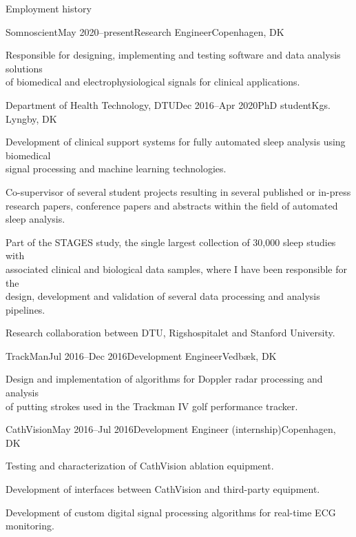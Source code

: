\documentclass{resume} %
\begin{document}
\begin{rSection}{Employment history}

    \begin{rSubsection}{Somnoscient}{May 2020--present}{Research Engineer}{Copenhagen, DK}
		\item Responsible for designing, implementing and testing software and data analysis solutions \\of biomedical and electrophysiological signals for clinical applications.
	\end{rSubsection}
	
	\begin{rSubsection}{Department of Health Technology, DTU}{Dec 2016--Apr 2020}{PhD student}{Kgs. Lyngby, DK}
		\item Development of clinical support systems for fully automated sleep analysis using biomedical\\signal processing and machine learning technologies.
		\item Co-supervisor of several student projects resulting in several published or in-press \\ research papers, conference papers and abstracts within the field of automated sleep analysis.
		\item Part of the STAGES study, the single largest collection of 30,000 sleep studies with \\ associated clinical and biological data samples, where I have been responsible for the \\ design, development and validation of several data processing and analysis pipelines.
		\item Research collaboration between DTU, Rigshospitalet and Stanford University.
	\end{rSubsection}
	
	\begin{rSubsection}{TrackMan}{Jul 2016--Dec 2016}{Development Engineer}{Vedbæk, DK}
		\item Design and implementation of algorithms for Doppler radar processing and analysis\\of putting strokes used in the Trackman IV golf performance tracker.
	\end{rSubsection}
	
	\begin{rSubsection}{CathVision}{May 2016--Jul 2016}{Development Engineer (internship)}{Copenhagen, DK}
		\item Testing and characterization of CathVision ablation equipment.
		\item Development of interfaces between CathVision and third-party equipment.
		\item Development of custom digital signal processing algorithms for real-time ECG monitoring.
	\end{rSubsection}


\end{rSection}
\end{document}

